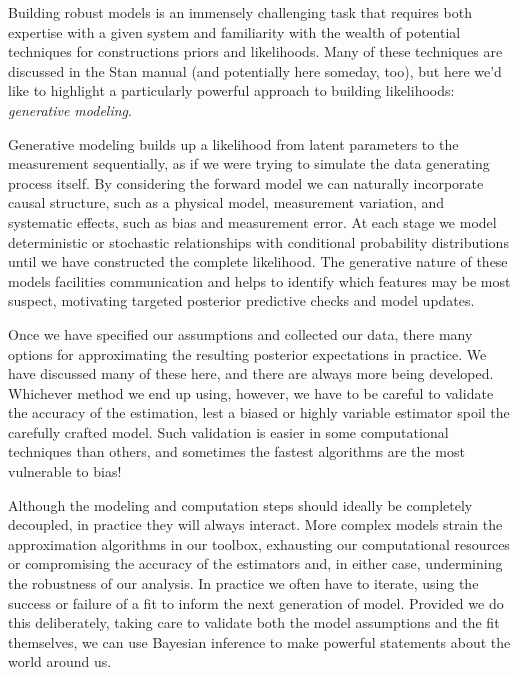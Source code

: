 Building robust models is an immensely challenging task
that requires both expertise with a given system and familiarity
with the wealth of potential techniques for constructions priors
and likelihoods.  Many of these techniques are discussed in
the Stan manual (and potentially here someday, too), but here
we'd like to highlight a particularly powerful approach to building
likelihoods: \emph{generative modeling}.  

Generative modeling builds up a likelihood from latent parameters
to the measurement sequentially, as if we were trying to simulate
the data generating process itself.  By considering the forward
model we can naturally incorporate causal structure, such as a 
physical model, measurement variation, and systematic effects,
such as bias and measurement error.  At each stage we model
deterministic or stochastic relationships with conditional probability
distributions until we have constructed the complete likelihood.
The generative nature of these models facilities communication
and helps to identify which features may be most suspect, 
motivating targeted posterior predictive checks and model updates.

Once we have specified our assumptions and collected our
data, there many options for approximating the resulting
posterior expectations in practice.  We have discussed many
of these here, and there are always more being developed.
Whichever method we end up using, however, we have to
be careful to validate the accuracy of the estimation, lest a 
biased or highly variable estimator spoil the carefully crafted
model.  Such validation is easier in some computational
techniques than others, and sometimes the fastest algorithms
are the most vulnerable to bias!

Although the modeling and computation steps should ideally
be completely decoupled, in practice they will always interact.
More complex models strain the approximation algorithms in
our toolbox, exhausting our computational resources or
compromising the accuracy of the estimators and, in either 
case, undermining the robustness of our analysis.  In practice
we often have to iterate, using the success or failure of a
fit to inform the next generation of model.  Provided we do
this deliberately, taking care to validate both the model 
assumptions and the fit themselves, we can use Bayesian 
inference to make powerful statements about the world around 
us.

